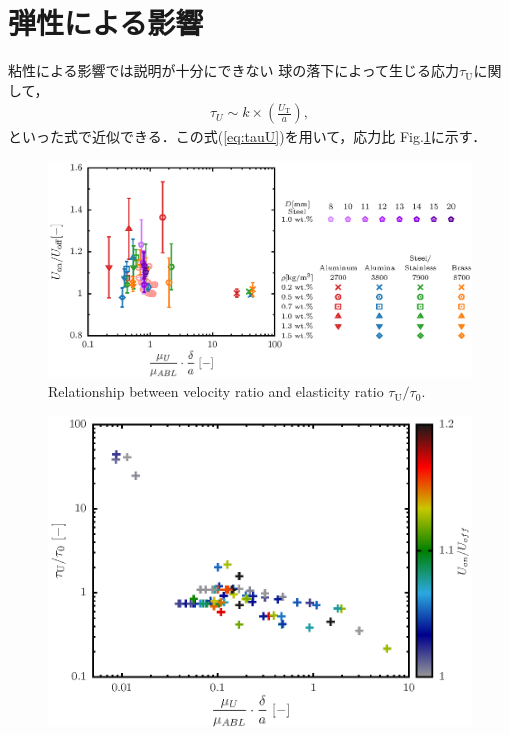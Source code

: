 \section{弾性による影響}

粘性による影響では説明が十分にできない
球の落下によって生じる応力$\tau_\text{U}$に関して，
\begin{eqnarray}
    \tau_U \sim k \times \left(\frac{U_\text{T}}{a}\right),
    \label{eq:tauU}
\end{eqnarray}
といった式で近似できる．この式(\ref{eq:tauU})を用いて，応力比
Fig.\ref{fig:elastcity}に示す．

\begin{figure}[h]
    \centering
    \includegraphics[width=1.0\textwidth]{5-Results/elastcity.eps}
    \caption{Relationship between velocity ratio and elasticity ratio $\tau_\text{U}/\tau_\text{0}$.}
    \label{fig:elastcity}
\end{figure}

\begin{figure}[h]
    \centering
    \includegraphics[width=1.0\textwidth]{5-Results/elastcity_color.eps}
    \caption{}
    \label{fig:elastcityColor}
\end{figure}
